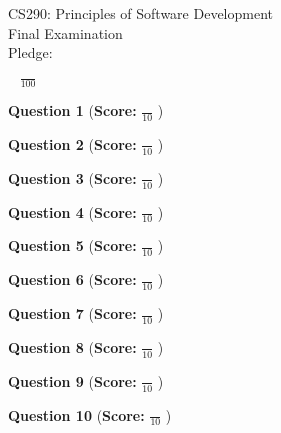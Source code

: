 \documentclass[12pt, epsf,psfig]{article}
\begin{document}
\begin{center}

CS290: Principles of Software Development \\
Final Examination  \\
Pledge: \\

\vspace*{1.5in}

{\LARGE $\;\;\;\frac{}{100}$ }

\end{center}

\newpage

{\bf Question 1} ({\bf Score:} \Large {$\frac{}{10}$} \normalsize )

\newpage

{\bf Question 2} ({\bf Score:} \Large {$\frac{}{10}$} \normalsize )

\newpage

{\bf Question 3} ({\bf Score:} \Large {$\frac{}{10}$} \normalsize )

\newpage

{\bf Question 4} ({\bf Score:} \Large {$\frac{}{10}$} \normalsize )

\newpage

{\bf Question 5} ({\bf Score:} \Large {$\frac{}{10}$} \normalsize )

\newpage

{\bf Question 6} ({\bf Score:} \Large {$\frac{}{10}$} \normalsize )

\newpage

{\bf Question 7} ({\bf Score:} \Large {$\frac{}{10}$} \normalsize )

\newpage

{\bf Question 8} ({\bf Score:} \Large {$\frac{}{10}$} \normalsize )

\newpage

{\bf Question 9} ({\bf Score:} \Large {$\frac{}{10}$} \normalsize )

\newpage

{\bf Question 10} ({\bf Score:} \Large {$\frac{}{10}$} \normalsize )

\newpage
\end{document}
